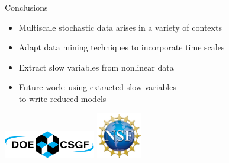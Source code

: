 \documentclass[12pt]{beamer}
\begin{document}
\begin{frame}{Conclusions}

\begin{itemize}
\item Multiscale stochastic data arises in a variety of contexts
\item Adapt data mining techniques to incorporate time scales
\item Extract slow variables from nonlinear data
\item Future work: using extracted slow variables \\to write reduced models

\end{itemize}

\vspace{2cm}
\centering
\includegraphics[width=4cm]{csgf_logo}
\hspace{2cm}
\includegraphics[width=2cm]{nsf_logo}

\end{frame}
\end{document}
